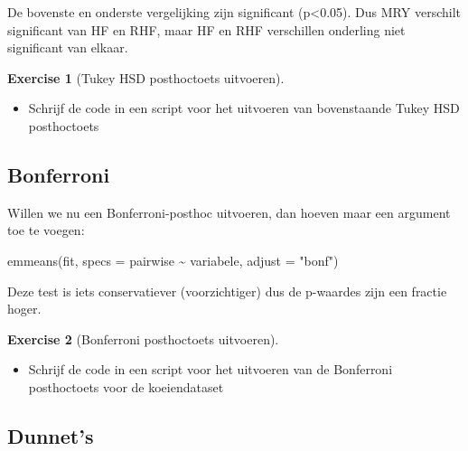\documentclass[
  letterpaper,
  DIV=11,
  numbers=noendperiod]{scrreprt}
\newenvironment{Shaded}{\begin{snugshade}}{\end{snugshade}}
\newcommand{\AttributeTok}[1]{\textcolor[rgb]{0.40,0.45,0.13}{#1}}
\newcommand{\FunctionTok}[1]{\textcolor[rgb]{0.28,0.35,0.67}{#1}}
\newcommand{\NormalTok}[1]{\textcolor[rgb]{0.00,0.23,0.31}{#1}}
\newcommand{\SpecialCharTok}[1]{\textcolor[rgb]{0.37,0.37,0.37}{#1}}
\newcommand{\StringTok}[1]{\textcolor[rgb]{0.13,0.47,0.30}{#1}}
\providecommand{\tightlist}{%
  \setlength{\itemsep}{0pt}\setlength{\parskip}{0pt}}\usepackage{longtable,booktabs,array}
\theoremstyle{definition}
\newtheorem{exercise}{Exercise}[chapter]
\theoremstyle{remark}
\begin{document}
De bovenste en onderste vergelijking zijn significant (p\textless0.05).
Dus MRY verschilt significant van HF en RHF, maar HF en RHF verschillen
onderling niet significant van elkaar.

\leavevmode{}%
\begin{exercise}[Tukey HSD posthoctoets uitvoeren]\label{exr-tukey}

\begin{itemize}
\tightlist
\item
  Schrijf de code in een script voor het uitvoeren van bovenstaande
  Tukey HSD posthoctoets
\end{itemize}

\end{exercise}

\hypertarget{bonferroni}{%
\subsection{Bonferroni}\label{bonferroni}}

Willen we nu een Bonferroni-posthoc uitvoeren, dan hoeven maar een
argument toe te voegen:

\begin{Shaded}
\begin{Highlighting}[]
\FunctionTok{emmeans}\NormalTok{(fit, }\AttributeTok{specs =}\NormalTok{ pairwise }\SpecialCharTok{\textasciitilde{}}\NormalTok{ variabele, }\AttributeTok{adjust =} \StringTok{"bonf"}\NormalTok{)}
\end{Highlighting}
\end{Shaded}

Deze test is iets conservatiever (voorzichtiger) dus de p-waardes zijn
een fractie hoger.

\leavevmode{}%
\begin{exercise}[Bonferroni posthoctoets uitvoeren]\label{exr-bonf}

\begin{itemize}
\tightlist
\item
  Schrijf de code in een script voor het uitvoeren van de Bonferroni
  posthoctoets voor de koeiendataset
\end{itemize}

\end{exercise}

\hypertarget{dunnets}{%
\subsection{Dunnet's}\label{dunnets}}
\end{document}
